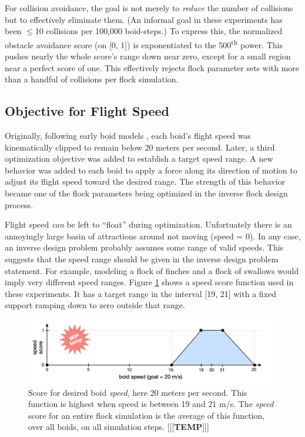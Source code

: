 \documentclass[letterpaper]{article}
\begin{document}
For collision avoidance, the goal is not merely to \textit{reduce} the number of collisions but to effectively eliminate them. (An informal goal in these experiments has been {$\leq$}10 collisions per 100,000 boid-steps.) To express this, the normalized obstacle avoidance score (on [0, 1]) is exponentiated to the 500\textsuperscript{th} power. This pushes nearly the whole score's range down near zero, except for a small region near a perfect score of one. This effectively rejects flock parameter sets with more than a handful of collisions per flock simulation.

\subsection{Objective for Flight Speed}
\label{subsec:speed_objective}

Originally, following early boid models \citep{reynolds_flocks_1987}, each boid's flight speed was kinematically clipped to remain below 20 meters per second. Later, a third optimization objective was added to establish a target speed range. A new behavior was added to each boid to apply a force along its direction of motion to adjust its flight speed toward the desired range. The strength of this behavior became one of the flock parameters being optimized in the inverse flock design process.

Flight speed \textit{can} be left to “float” during optimization. Unfortuately there is an annoyingly large basin of attractions around not moving (speed = 0). In any case, an inverse design problem probably assumes some range of valid speeds. This suggests that the speed range should be given in the inverse design problem statement. For example, modeling a flock of finches and a flock of swallows would imply very different speed ranges. Figure \ref{fig:speed_score} shows a speed score function used in these experiments. It has a target range in the interval [19, 21] with a fixed support ramping down to zero outside that range.


\begin{figure}[t]
    \centering
    \includegraphics[width=0.9\linewidth]{images/temp_speed_score.png}
    \caption{Score for desired boid \textit{speed}, here 20 meters per second. This function is highest when speed is between 19 and 21 m/s. The \textit{speed} score for an entire flock simulation is the average of this function, over all boids, on all simulation steps. [[[\textbf{TEMP}]]]}
    \label{fig:speed_score}
\end{figure}
\end{document}

